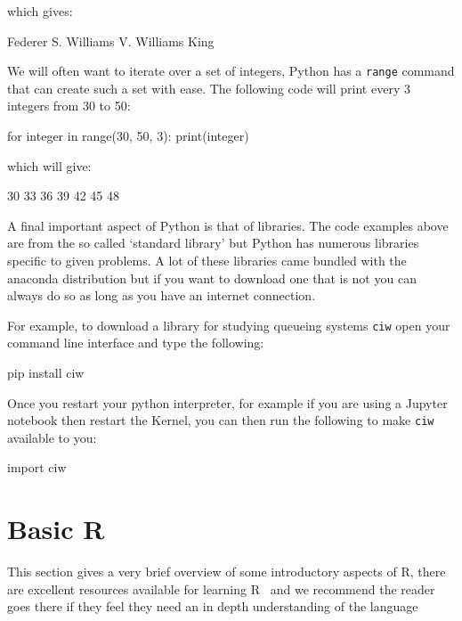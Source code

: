 which gives:

\begin{pyout}
Federer
S. Williams
V. Williams
King
\end{pyout}

We will often want to iterate over a set of integers, Python has a
\texttt{range} command that can create such a set with ease. The following
code will print every 3 integers from 30 to 50:


\begin{pyin}
for integer in range(30, 50, 3):
    print(integer)
\end{pyin}

which will give:

\begin{pyout}
30
33
36
39
42
45
48
\end{pyout}

A final important aspect of Python is that of libraries. The code examples above
are from the so called `standard library' but Python has numerous libraries
specific to given problems. A lot of these libraries came bundled with the
anaconda distribution but if you want to download one that is not you can always
do so as long as you have an internet connection.

For example, to download a library for studying queueing systems
\texttt{ciw} open your command line interface and type the
following:

\begin{cliin}
pip install ciw
\end{cliin}

Once you restart your python interpreter, for example if you are using a Jupyter
notebook then restart the Kernel, you can then run the following to make
\texttt{ciw} available to you:

\begin{pyin}
import ciw
\end{pyin}

\section{Basic R}\label{sec:basic-R}

This section gives a very brief overview of some introductory aspects of R,
there are excellent resources available for learning
R~\cite{wickham2014advanced} %
and we recommend the
reader goes there if they feel they need an in depth understanding of the
language %

